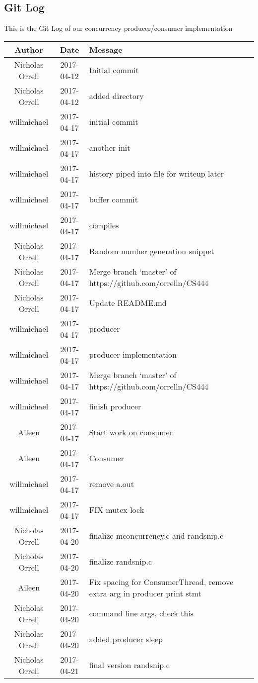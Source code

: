\documentclass[letterpaper, 10pt, notitlepage]{article}
\begin{document}
\subsection{Git Log}
This is the Git Log of our concurrency producer/consumer implementation
\begin{center}
\begin{tabular} { |c|c|l|c|}
    \hline
\bf Author & \bf Date & \bf Message \\ \hline
Nicholas Orrell & 2017-04-12 & Initial commit \\ \hline
Nicholas Orrell & 2017-04-12 & added directory \\ \hline
willmichael & 2017-04-17 & initial commit \\ \hline
willmichael & 2017-04-17 & another init \\ \hline
willmichael & 2017-04-17 & history piped into file for writeup later \\ \hline
willmichael & 2017-04-17 & buffer commit \\ \hline
willmichael & 2017-04-17 & compiles \\ \hline
Nicholas Orrell & 2017-04-17 & Random number generation snippet \\ \hline
Nicholas Orrell & 2017-04-17 & Merge branch `master' of https://github.com/orrelln/CS444 \\ \hline
Nicholas Orrell & 2017-04-17 & Update README.md \\ \hline
willmichael & 2017-04-17 & producer \\ \hline
willmichael & 2017-04-17 & producer implementation \\ \hline
willmichael & 2017-04-17 & Merge branch `master' of https://github.com/orrelln/CS444 \\ \hline
willmichael & 2017-04-17 & finish producer \\ \hline
Aileen & 2017-04-17 & Start work on consumer \\ \hline
Aileen & 2017-04-17 & Consumer \\ \hline
willmichael & 2017-04-17 & remove a.out \\ \hline
willmichael & 2017-04-17 & FIX mutex lock \\ \hline
Nicholas Orrell & 2017-04-20 & finalize mconcurrency.c and randsnip.c \\ \hline
Nicholas Orrell & 2017-04-20 & finalize randsnip.c \\ \hline
Aileen & 2017-04-20 & Fix spacing for ConsumerThread, remove extra arg in producer print stmt \\ \hline
Nicholas Orrell & 2017-04-20 & command line args, check this \\ \hline
Nicholas Orrell & 2017-04-20 & added producer sleep \\ \hline
Nicholas Orrell & 2017-04-21 & final version randsnip.c \\\hline
\end{tabular}
\end{center}
\end{document}
